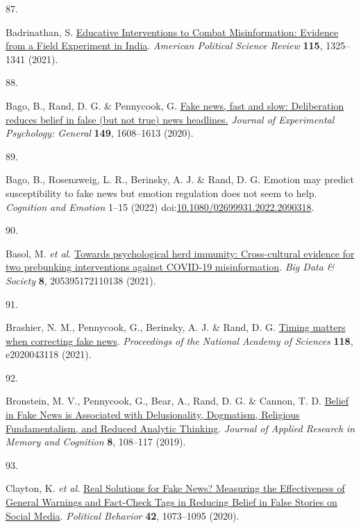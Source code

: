 \documentclass[
  doc,floatsintext]{apa6}
\newlength{\cslhangindent}
\newlength{\csllabelwidth}
\newenvironment{CSLReferences}[2] %
 {\begin{list}{}{%
  \setlength{\itemindent}{0pt}
  \setlength{\leftmargin}{0pt}
  \setlength{\parsep}{0pt}
  \ifodd #1
   \setlength{\leftmargin}{\cslhangindent}
   \setlength{\itemindent}{-1\cslhangindent}
  \fi
  \setlength{\itemsep}{#2\baselineskip}}}
 {\end{list}}
\newcommand{\CSLLeftMargin}[1]{\parbox[t]{\csllabelwidth}{\strut#1\strut}}
\newcommand{\CSLRightInline}[1]{\parbox[t]{\linewidth - \csllabelwidth}{\strut#1\strut}}
\begin{document}
\begin{CSLReferences}{0}{0}
\CSLLeftMargin{87. }%
\CSLRightInline{*Badrinathan, S. \href{https://doi.org/10.1017/S0003055421000459}{Educative Interventions to Combat Misinformation: Evidence from a Field Experiment in India}. \emph{American Political Science Review} \textbf{115}, 1325--1341 (2021).}

\CSLLeftMargin{88. }%
\CSLRightInline{*Bago, B., Rand, D. G. \& Pennycook, G. \href{https://doi.org/10.1037/xge0000729}{Fake news, fast and slow: Deliberation reduces belief in false (but not true) news headlines.} \emph{Journal of Experimental Psychology: General} \textbf{149}, 1608--1613 (2020).}

\CSLLeftMargin{89. }%
\CSLRightInline{*Bago, B., Rosenzweig, L. R., Berinsky, A. J. \& Rand, D. G. Emotion may predict susceptibility to fake news but emotion regulation does not seem to help. \emph{Cognition and Emotion} 1--15 (2022) doi:\href{https://doi.org/10.1080/02699931.2022.2090318}{10.1080/02699931.2022.2090318}.}

\CSLLeftMargin{90. }%
\CSLRightInline{*Basol, M. \emph{et al.} \href{https://doi.org/10.1177/20539517211013868}{Towards psychological herd immunity: Cross-cultural evidence for two prebunking interventions against COVID-19 misinformation}. \emph{Big Data \& Society} \textbf{8}, 205395172110138 (2021).}

\CSLLeftMargin{91. }%
\CSLRightInline{*Brashier, N. M., Pennycook, G., Berinsky, A. J. \& Rand, D. G. \href{https://doi.org/10.1073/pnas.2020043118}{Timing matters when correcting fake news}. \emph{Proceedings of the National Academy of Sciences} \textbf{118}, e2020043118 (2021).}

\CSLLeftMargin{92. }%
\CSLRightInline{*Bronstein, M. V., Pennycook, G., Bear, A., Rand, D. G. \& Cannon, T. D. \href{https://doi.org/10.1016/j.jarmac.2018.09.005}{Belief in Fake News is Associated with Delusionality, Dogmatism, Religious Fundamentalism, and Reduced Analytic Thinking}. \emph{Journal of Applied Research in Memory and Cognition} \textbf{8}, 108--117 (2019).}

\CSLLeftMargin{93. }%
\CSLRightInline{*Clayton, K. \emph{et al.} \href{https://doi.org/10.1007/s11109-019-09533-0}{Real Solutions for Fake News? Measuring the Effectiveness of General Warnings and Fact-Check Tags in Reducing Belief in False Stories on Social Media}. \emph{Political Behavior} \textbf{42}, 1073--1095 (2020).}


\end{CSLReferences}
\end{document}
